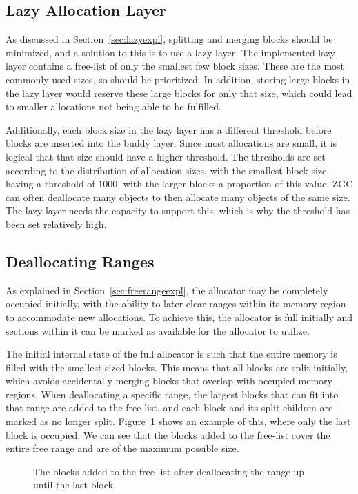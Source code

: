\subsection{Lazy Allocation Layer}
As discussed in Section~\ref{sec:lazyexpl}, splitting and merging blocks should be minimized, and a solution to this is to use a lazy layer. The implemented lazy layer contains a free-list of only the smallest few block sizes. These are the most commonly used sizes, so should be prioritized. In addition, storing large blocks in the lazy layer would reserve these large blocks for only that size, which could lead to smaller allocations not being able to be fulfilled.

Additionally, each block size in the lazy layer has a different threshold before blocks are inserted into the buddy layer. Since most allocations are small, it is logical that that size should have a higher threshold. The thresholds are set according to the distribution of allocation sizes, with the smallest block size having a threshold of $1 000$, with the larger blocks a proportion of this value. ZGC can often deallocate many objects to then allocate many objects of the same size. The lazy layer needs the capacity to support this, which is why the threshold has been set relatively high.

\subsection{Deallocating Ranges}
As explained in Section~\ref{sec:freerangeexpl}, the allocator may be completely occupied initially, with the ability to later clear ranges within its memory region to accommodate new allocations. To achieve this, the allocator is full initially and sections within it can be marked as available for the allocator to utilize.

The initial internal state of the full allocator is such that the entire memory is filled with the smallest-sized blocks. This means that all blocks are split initially, which avoids accidentally merging blocks that overlap with occupied memory regions. When deallocating a specific range, the largest blocks that can fit into that range are added to the free-list, and each block and its split children are marked as no longer split. Figure~\ref{fig:deallocrange} shows an example of this, where only the last block is occupied. We can see that the blocks added to the free-list cover the entire free range and are of the maximum possible size.

\begin{figure}[H]
    \centering
    
    \caption{The blocks added to the free-list after deallocating the range up until the last block.}
    \label{fig:deallocrange}
\end{figure}


